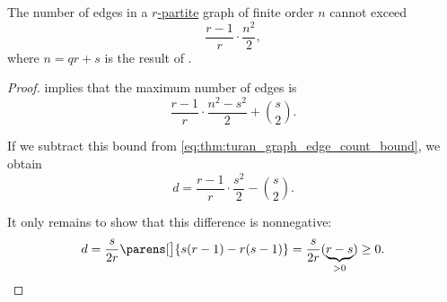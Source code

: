 \begin{corollary}\label{thm:turan_graph_edge_count_bound}
  The number of edges in a \hyperref[def:multipartite_graph]{\( r \)-partite} graph of finite order \( n \) cannot exceed
  \begin{equation}\label{eq:thm:turan_graph_edge_count_bound}
    \frac {r - 1} r \cdot \frac {n^2} 2,
  \end{equation}
  where \( n = qr + s \) is the result of .
\end{corollary}
\begin{proof}
   implies that the maximum number of edges is
  \begin{equation*}
    \frac {r - 1} r \cdot \frac {n^2 - s^2} 2 + \binom s 2.
  \end{equation*}

  If we subtract this bound from \eqref{eq:thm:turan_graph_edge_count_bound}, we obtain
  \begin{equation*}
    d = \frac {r - 1} r \cdot \frac {s^2} 2 - \binom s 2.
  \end{equation*}

  It only remains to show that this difference is nonnegative:
  \begin{equation*}
    d = \frac s {2r} \parens[\big]{ s(r - 1) - r(s - 1) } = \frac s {2r} (\underbrace{r - s}_{> 0}) \geq 0.
  \end{equation*}
\end{proof}

